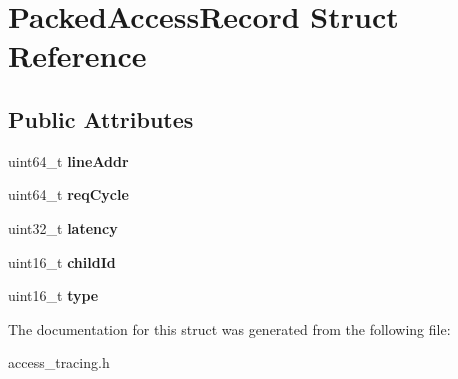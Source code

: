 \hypertarget{structPackedAccessRecord}{\section{Packed\-Access\-Record Struct Reference}
\label{structPackedAccessRecord}
}
\subsection*{Public Attributes}
\begin{DoxyCompactItemize}
\item 
\hypertarget{structPackedAccessRecord_a848174e5e0322cea4fa444f88524ee3f}{uint64\-\_\-t {\bfseries line\-Addr}}\label{structPackedAccessRecord_a848174e5e0322cea4fa444f88524ee3f}

\item 
\hypertarget{structPackedAccessRecord_a48a3894a532046f34845312bf82cc58e}{uint64\-\_\-t {\bfseries req\-Cycle}}\label{structPackedAccessRecord_a48a3894a532046f34845312bf82cc58e}

\item 
\hypertarget{structPackedAccessRecord_a7eb254c1094082471faa4edee540b94d}{uint32\-\_\-t {\bfseries latency}}\label{structPackedAccessRecord_a7eb254c1094082471faa4edee540b94d}

\item 
\hypertarget{structPackedAccessRecord_ae8c280e01a786e1b9ad2f18d21b63b42}{uint16\-\_\-t {\bfseries child\-Id}}\label{structPackedAccessRecord_ae8c280e01a786e1b9ad2f18d21b63b42}

\item 
\hypertarget{structPackedAccessRecord_a68a0c28f420ccd7b246f1322f059d62d}{uint16\-\_\-t {\bfseries type}}\label{structPackedAccessRecord_a68a0c28f420ccd7b246f1322f059d62d}

\end{DoxyCompactItemize}


The documentation for this struct was generated from the following file\-:\begin{DoxyCompactItemize}
\item 
access\-\_\-tracing.\-h\end{DoxyCompactItemize}
